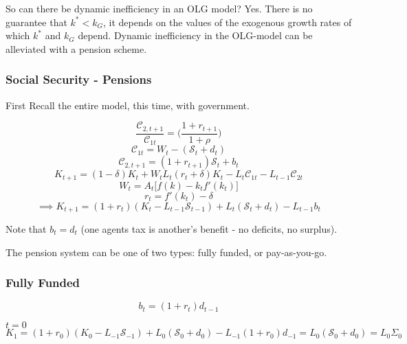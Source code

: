 So can there be dynamic inefficiency in an OLG model? Yes. There is no guarantee that $k^*<k_{G}$, it depends on the values of the exogenous growth rates of which $k^*$ and $k_{G}$ depend. Dynamic inefficiency in the OLG-model can be alleviated with a pension scheme.

\subsubsection{Social Security - Pensions}
First Recall the entire model, this time, with government.

\begin{equation}
    \frac{\mathcal{C}_{2,t+1}}{\mathcal{C}_{1t}}=\bigg(\frac{1+r_{t+1}}{1+\rho}\bigg)
\end{equation}
\begin{equation}
    \mathcal{C}_{1t}=W_{t}-(\mathcal{S}_{t}+d_{t})
\end{equation}
\begin{equation}
    \mathcal{C}_{2,t+1}=(1+r_{t+1})\mathcal{S}_{t}+b_{t}
\end{equation}
\begin{equation}\label{Cap_acc_OLG}
    K_{t+1}=(1-\delta)K_{t}+W_{t}L_{t}(r_{t}+\delta)K_{t}-L_{t}\mathcal{C}_{1t}-L_{t-1}\mathcal{C}_{2t}
\end{equation}
\begin{equation}
    W_{t}=A_{t}\bigg[ f(k)-k_{t}f'(k_{t})\bigg]
\end{equation}
\begin{equation}
    r_{t}=f'(k_{t})-\delta
\end{equation}
\begin{equation*}
    \implies K_{t+1}=(1+r_{t})(K_{t}-L_{t-1}\mathcal{S}_{t-1})+L_{t}(\mathcal{S}_{t}+d_{t})-L_{t-1}b_{t}
\end{equation*}

Note that $b_{t}=d_{t}$ (one agents tax is another's benefit - no deficits, no surplus).

The pension system can be one of two types: fully funded, or pay-as-you-go. 

\subsubsection{Fully Funded}
\begin{equation}
    b_{t}=(1+r_{t})d_{t-1}
\end{equation}

$t=0$
\begin{equation*}
    K_{1}=(1+r_{0})(K_{0}-L_{-1}\mathcal{S}_{-1})+L_{0}(\mathcal{S}_{0}+d_{0})-L_{-1}(1+r_{0})d_{-1}=L_{0}(\mathcal{S}_{0}+d_{0})=L_{0}\Sigma_{0}
\end{equation*}

